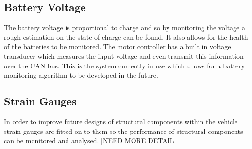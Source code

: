 \subsection{Battery Voltage}

The battery voltage is proportional to charge and so by monitoring the voltage a rough estimation on the state of charge can be found. It also allows for the health of the batteries to be monitored. The motor controller has a built in voltage transducer which measures the input voltage and even transmit this information over the CAN bus. This is the system currently in use which allows for a battery monitoring algorithm to be developed in the future.

\subsection{Strain Gauges}
In order to improve future designs of structural components within the vehicle strain gauges are fitted on to them so the performance of structural components can be monitored and analysed. [NEED MORE DETAIL]